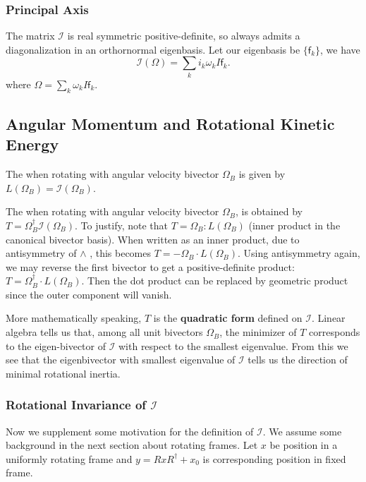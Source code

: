 \subsubsection{Principal Axis}

The matrix $\mathcal{I}$ is real symmetric positive-definite, so always admits a diagonalization in an orthornormal eigenbasis. Let our eigenbasis be $\{\mathsf{f}_k\}$, we have
\[
	\mathcal{I}(\Omega) = \sum_k i_k \omega_k I \mathsf{f}_k
.\] 
where $\Omega = \sum_k \omega_k I \mathsf{f}_k$.



\subsection{Angular Momentum and Rotational Kinetic Energy}

The  when rotating with angular velocity bivector $\Omega_B$ is given by $L(\Omega_B) = \mathcal{I}(\Omega_B)$.

The  when rotating with angular velocity bivector $\Omega_B$, is obtained by $T = \Omega_B^\dagger \mathcal{I}(\Omega_B)$.
To justify, note that $T = \Omega_B : L(\Omega_B)$ (inner product in the canonical bivector basis). When written as an inner product, due to antisymmetry of $\wedge$ , this becomes $T = - \Omega_B \cdot L(\Omega_B)$. Using antisymmetry again, we may reverse the first bivector to get a positive-definite product: $T = \Omega_B^\dag \cdot L(\Omega_B)$. Then the dot product can be replaced by geometric product since the outer component will vanish.

\begin{remark}
More mathematically speaking, $T$ is the \textbf{quadratic form} defined on $\mathcal{I}$. Linear algebra tells us that, among all unit bivectors $\Omega_B$, the minimizer of $T$ corresponds to the eigen-bivector of $\mathcal{I}$ with respect to the smallest eigenvalue. From this we see that the eigenbivector with smallest eigenvalue of $\mathcal{I}$ tells us the direction of minimal rotational inertia.
\end{remark}

\subsubsection{Rotational Invariance of $\mathcal{I}$}

Now we supplement some motivation for the definition of $\mathcal{I}$. We assume some background in the next section about rotating frames. Let $x$ be position in a uniformly rotating frame and $y = R x R^\dag + x_0$ is corresponding position in fixed frame.

